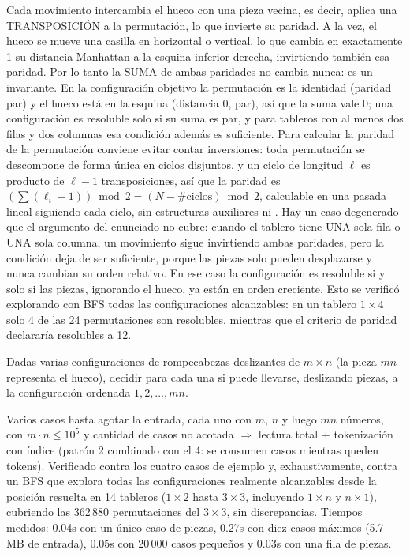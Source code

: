  Cada movimiento intercambia el hueco con una pieza vecina, es decir, aplica una TRANSPOSICIÓN a la permutación, lo que invierte su paridad. A la vez, el hueco se mueve una casilla en horizontal o vertical, lo que cambia en exactamente 1 su distancia Manhattan a la esquina inferior derecha, invirtiendo también esa paridad. Por lo tanto la SUMA de ambas paridades no cambia nunca: es un invariante. En la configuración objetivo la permutación es la identidad (paridad par) y el hueco está en la esquina (distancia 0, par), así que la suma vale 0; una configuración es resoluble solo si su suma es par, y para tableros con al menos dos filas y dos columnas esa condición además es suficiente. Para calcular la paridad de la permutación conviene evitar contar inversiones: toda permutación se descompone de forma única en ciclos disjuntos, y un ciclo de longitud $\ell$ es producto de $\ell - 1$ transposiciones, así que la paridad es $\left(\sum (\ell_i - 1)\right) \bmod 2 = (N - \#\text{ciclos}) \bmod 2$, calculable en una pasada lineal siguiendo cada ciclo, sin estructuras auxiliares ni . Hay un caso degenerado que el argumento del enunciado no cubre: cuando el tablero tiene UNA sola fila o UNA sola columna, un movimiento sigue invirtiendo ambas paridades, pero la condición deja de ser suficiente, porque las piezas solo pueden desplazarse y nunca cambian su orden relativo. En ese caso la configuración es resoluble si y solo si las piezas, ignorando el hueco, ya están en orden creciente. Esto se verificó explorando con BFS todas las configuraciones alcanzables: en un tablero $1\times4$ solo 4 de las 24 permutaciones son resolubles, mientras que el criterio de paridad declararía resolubles a 12.


Dadas varias configuraciones de rompecabezas deslizantes de $m \times n$ (la pieza $mn$ representa el hueco), decidir para cada una si puede llevarse, deslizando piezas, a la configuración ordenada $1, 2, \ldots, mn$.

 Varios casos hasta agotar la entrada, cada uno con $m$, $n$ y luego $mn$ números, con $m \cdot n \le 10^5$ y cantidad de casos no acotada $\Rightarrow$ lectura total + tokenización con índice (patrón 2 combinado con el 4: se consumen casos mientras queden tokens). Verificado contra los cuatro casos de ejemplo y, exhaustivamente, contra un BFS que explora todas las configuraciones realmente alcanzables desde la posición resuelta en 14 tableros ($1\times2$ hasta $3\times3$, incluyendo $1\times n$ y $n\times1$), cubriendo las 362\,880 permutaciones del $3\times3$, sin discrepancias. Tiempos medidos: \aprox{}0.04s con un único caso de  piezas, \aprox{}0.27s con diez casos máximos (5.7 MB de entrada), \aprox{}0.05s con 20\,000 casos pequeños y \aprox{}0.03s con una fila de  piezas.

